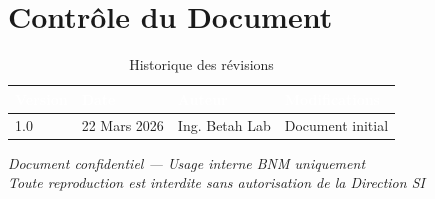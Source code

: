 \documentclass[a4paper,11pt]{article}
\begin{document}
\section{Contrôle du Document}

\begin{table}[h!]
\centering
\renewcommand{\arraystretch}{1.4}
\begin{tabular}{|l|l|l|l|}
\hline
\rowcolor{bnmblue}\textcolor{white}{\textbf{Version}} & \textcolor{white}{\textbf{Date}} & \textcolor{white}{\textbf{Auteur}} & \textcolor{white}{\textbf{Modifications}} \\
\hline
1.0 & 22 Mars 2026 & Ing. Betah Lab & Document initial \\
\hline
\end{tabular}
\caption{Historique des révisions}
\end{table}

\vspace{2em}
\begin{center}
  \textcolor{bnmgray}{\small \textit{Document confidentiel — Usage interne BNM uniquement}}\\
  \textcolor{bnmgray}{\small \textit{Toute reproduction est interdite sans autorisation de la Direction SI}}
\end{center}
\end{document}
